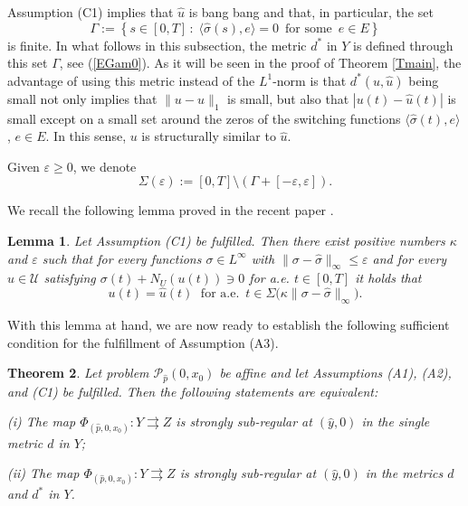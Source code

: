 \documentclass[11pt]{article}
\newtheorem{theo}{Theorem}[section]
\newtheorem{lem}[theo]{Lemma}
\newcommand{\bd}{\begin{displaymath}}
\newcommand{\ed}{\end{displaymath}}
\newcommand{\sm}{\setminus}
\newcommand{\U}{\mathcal U}
\newcommand{\e}{\varepsilon}
\newcommand{\sth}{ \, :\;}
\newcommand{\To}{\rightrightarrows }
\newcommand{\bino}{\bigskip\noindent}
\begin{document}
\bino
Assumption (C1) implies that $\hat u$ is bang bang and that, in particular, the set 
\bd
         \Gamma:=\left\{ s \in[0,T] \sth \langle\hat \sigma(s),e \rangle=0 \, \text{ for some }\, e\in E \right\}
\ed
is finite. In what follows in this subsection,  the metric $d^*$ in $Y$ is defined through this set $\Gamma$,
see (\ref{EGam0}).
As it will be seen in the proof of Theorem \ref{Tmain}, the advantage of using this metric instead of 
the $L^1$-norm is that $d^*(u,\hat u)$ being small not only implies that $\| u - \hat u\|_1$
is small, but also that $|u(t) - \hat u(t)|$ is small except on a small set around the zeros of the switching functions
$\langle \hat\sigma(t), e\rangle$, $e \in E$. In this sense, $u$ is structurally similar to $\hat u$.

Given $\e \geq 0$, we  denote
\bd
         \Sigma(\e) := [0,T] \sm (\Gamma + [-\e, \e]).
\ed 

We recall the following lemma proved in the recent paper \cite{Sozopol}.

\begin{lem}{\cite[Lemma 2]{Sozopol}} \label{LH3}
Let Assumption (C1) be fulfilled. Then there exist  positive numbers $\kappa$ and $\e$ such that for every functions 
$\sigma \in L^\infty$ with $\|\sigma-\hat\sigma\|_\infty\le \e$ and for every $u \in \U$
satisfying $\sigma(t) + N_U(u(t)) \ni 0$ for a.e. $t \in [0,T]$ it holds that 
\bd
	u(t) = \hat u(t) \;\mbox{  for a.e. } \, t \in \Sigma\big(\kappa \| \sigma - \hat \sigma \|_\infty \big).
\ed
\end{lem} 

With this lemma at hand, we are now ready to establish the following sufficient condition for the fulfillment of Assumption (A3). 

\begin{theo}
Let problem $\mathcal P_{\hat p}(0,x_0)$ be affine and let Assumptions (A1), (A2), and (C1) be fulfilled. Then the following
statements are equivalent:

(i) The map $\Phi_{(\hat p,0,x_0)} : Y \To Z$ is strongly sub-regular at $(\hat y,0)$ in the single metric $d$ in $Y$; 

(ii)  The map $\Phi_{(\hat p,0,x_0)} : Y \To Z$ is strongly sub-regular at $(\hat y,0)$ in the metrics $d$ and $d^*$ in $Y$.
\end{theo}
\end{document}
